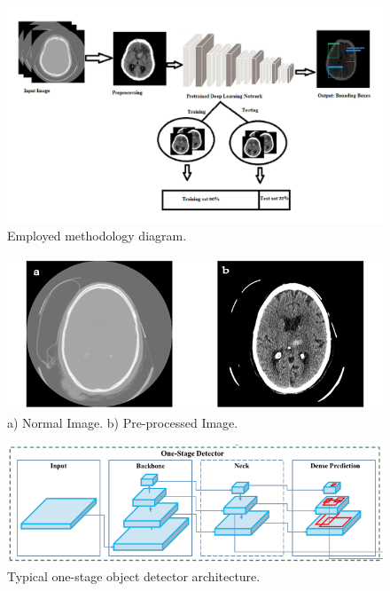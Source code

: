 \documentclass[Print]{../Style/isecure-v24}
\begin{document}
{\begin{figure}[h]
    \centering
    \includegraphics[width=1.0\linewidth]{ISeCure Draft/Images/model.png}
    \captionsetup{font=small}
    \caption{Employed methodology diagram.}
    \label{fig:employed_method}
\end{figure}}
\newpage
{\begin{figure}[h]
    \centering
    \includegraphics[width=1.0\linewidth]{ISeCure Draft/Images/NAP.png}
    \captionsetup{font=small}
    \caption{a) Normal Image. b) Pre-processed Image.}
    \label{fig:normal and processed}
\end{figure}}

{\begin{figure}[h]
    \centering
    \includegraphics[width=1.0\linewidth]{ISeCure Draft/Images/OSD.png}
    \captionsetup{font=small}
    \caption{Typical one-stage object detector architecture.}
    \label{fig:one stage od}
\end{figure}}
\end{document}
